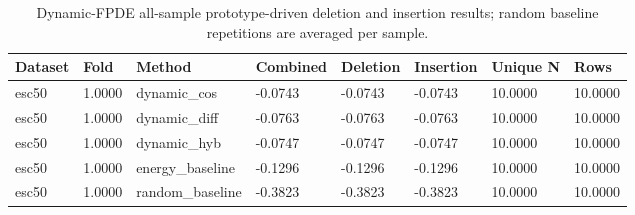 \begin{table}[htbp]
\centering
\caption{Dynamic-FPDE all-sample prototype-driven deletion and insertion results; random baseline repetitions are averaged per sample.}
\label{tab:dynamic-fpde-main-results}
\begin{tabular}{llllllll}
\toprule
Dataset & Fold & Method & Combined & Deletion & Insertion & Unique N & Rows \\
\midrule
esc50 & 1.0000 & dynamic\_cos & -0.0743 & -0.0743 & -0.0743 & 10.0000 & 10.0000 \\
esc50 & 1.0000 & dynamic\_diff & -0.0763 & -0.0763 & -0.0763 & 10.0000 & 10.0000 \\
esc50 & 1.0000 & dynamic\_hyb & -0.0747 & -0.0747 & -0.0747 & 10.0000 & 10.0000 \\
esc50 & 1.0000 & energy\_baseline & -0.1296 & -0.1296 & -0.1296 & 10.0000 & 10.0000 \\
esc50 & 1.0000 & random\_baseline & -0.3823 & -0.3823 & -0.3823 & 10.0000 & 10.0000 \\
\bottomrule
\end{tabular}
\end{table}
